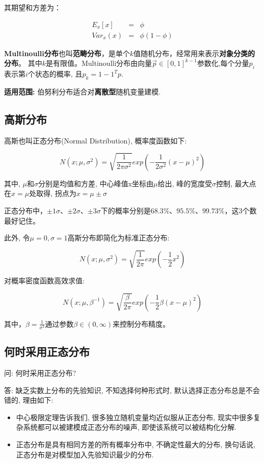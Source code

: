 其期望和方差为：

\begin{eqnarray*}
	E_x[x] &=& \phi \\
	Var_x(x) &=& \phi{(1-\phi)}
\end{eqnarray*}

{\bf Multinoulli分布}也叫{\bf 范畴分布}，是单个$k$值随机分布，经常用来表示{\bf 对象分类的分布}。 其中$k$是有限值。Multinoulli分布由向量$\vec{p}\in[0,1]^{k-1}$参数化,每个分量$p_i$表示第$i$个状态的概率, 且$p_k=1-1^Tp$.

{\bf 适用范围:} 伯努利分布适合对{\bf 离散型}随机变量建模.

\subsection{高斯分布}

高斯也叫正态分布(Normal Distribution), 概率度函数如下:  

$$
N(x;\mu,\sigma^2) = \sqrt{\frac{1}{2\pi\sigma^2}}exp\left ( -\frac{1}{2\sigma^2}(x-\mu)^2 \right )
$$

其中, $\mu$和$\sigma$分别是均值和方差, 中心峰值x坐标由$\mu$给出, 峰的宽度受$\sigma$控制, 最大点在$x=\mu$处取得, 拐点为$x=\mu\pm\sigma$

正态分布中，$\pm 1\sigma$、$\pm 2\sigma$、$\pm 3\sigma$下的概率分别是$68.3\%、95.5\%、99.73\%$，这3个数最好记住。 

此外, 令$\mu=0,\sigma=1$高斯分布即简化为标准正态分布: 

$$
N(x;\mu,\sigma^2) = \sqrt{\frac{1}{2\pi}}exp\left ( -\frac{1}{2}x^2 \right )
$$

对概率密度函数高效求值: 

$$
N(x;\mu,\beta^{-1})=\sqrt{\frac{\beta}{2\pi}}exp\left(-\frac{1}{2}\beta(x-\mu)^2\right)
$$

其中，$\beta=\frac{1}{\sigma^2}$通过参数$\beta\in(0,\infty)$来控制分布精度。

\subsection{何时采用正态分布}

问: 何时采用正态分布? 

答: 缺乏实数上分布的先验知识, 不知选择何种形式时, 默认选择正态分布总是不会错的, 理由如下: 

\begin{itemize}\itemsep0em
		\item 中心极限定理告诉我们, 很多独立随机变量均近似服从正态分布, 现实中很多复杂系统都可以被建模成正态分布的噪声, 即使该系统可以被结构化分解. 
		\item 正态分布是具有相同方差的所有概率分布中, 不确定性最大的分布, 换句话说, 正态分布是对模型加入先验知识最少的分布.
\end{itemize}

